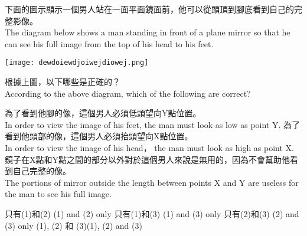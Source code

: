 {
    下面的圖示顯示一個男人站在一面平面鏡面前，他可以從頭頂到腳底看到自己的完整影像。\\The diagram below shows a man standing in front of a plane mirror so that he can see his full image from the top of his head to his feet.
        {\par\centering
            \texttt{[image: dewdoiewdjoiwejdiowej.png]}\par}
    根據上圖，以下哪些是正確的？\\According to the above diagram, which of the following are correct?
    \begin{statements}
        \task 為了看到他腳的像，這個男人必須低頭望向Y點位置。\\In order to view the image of his feet, the man must look as low as point Y.
        \task 為了看到他頭部的像，這個男人必須抬頭望向X點位置。\\In order to view the image of his head， the man must look as high as point X.
        \task 鏡子在X點和Y點之間的部分以外對於這個男人來說是無用的，因為不會幫助他看到自己完整的像。\\The portions of mirror outside the length between points X and Y are useless for the man to see his full image.
    \end{statements}
    \begin{tasks}
        \task 只有(1)和(2) \tab (1) and (2) only
        \task 只有(1)和(3) \tab (1) and (3) only
        \task 只有(2)和(3) \tab (2) and (3) only
        \task (1), (2) 和 (3)\tab (1), (2) and (3)
    \end{tasks}
}
{}


{}

